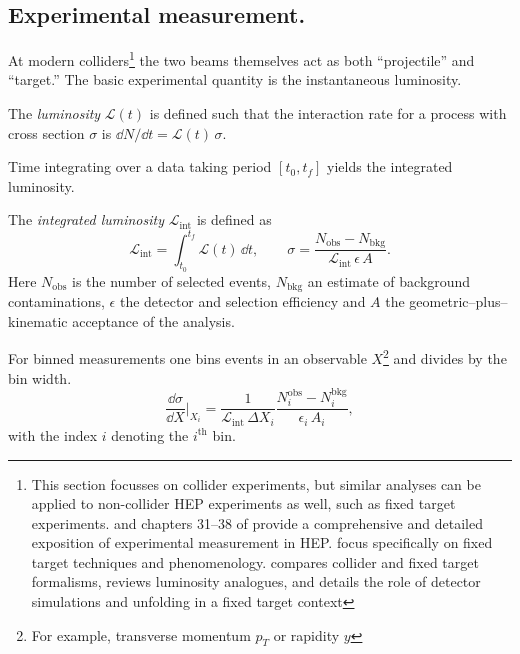 \begin{definition}
    \subsection{Experimental measurement.}
    \label{subsec:exp_measurement}
        At modern colliders\footnote{
            This section focusses on collider experiments, but similar analyses can be applied to non-collider HEP experiments as well, such as fixed target experiments.
            \cite{leo_techniques_1994} and chapters \numrange{31}{38} of \cite{particle_data_group_review_2022} provide a comprehensive and detailed exposition of experimental measurement in HEP.
            \cite{Brodsky2013PhysicsBeams, AveryCrossRates} focus specifically on fixed target techniques and phenomenology.
            \cite{MuheimNuclearLaws} compares collider and fixed target formalisms, reviews luminosity analogues, and details the role of detector simulations and unfolding in a fixed target context
        } the two beams themselves act as both ``projectile'' and ``target.'' 
        The basic experimental quantity is the instantaneous luminosity.
        \begin{definition}
            The \emph{luminosity} \(\mathcal{L}(t)\) is defined such that the interaction rate for a process with cross section \(\sigma\) is \(\dd N/\dd t = \mathcal{L}(t)\,\sigma\).
        \end{definition}

        Time integrating over a data taking period \([t_0, t_f]\) yields the integrated luminosity.
        \begin{definition}
            The \emph{integrated luminosity} \(\mathcal{L}_{\text{int}}\) is defined as
            \begin{equation}
                \mathcal{L}_{\text{int}}
                = \int_{t_0}^{t_f} \mathcal{L}(t)\,\dd t,
                \qquad
                \sigma
                = \frac{N_{\text{obs}} - N_{\text{bkg}}}
                       {\mathcal{L}_{\text{int}}\,\epsilon\,A}.
                \label{eq:crossec_collider}
              \end{equation}
              Here \(N_{\text{obs}}\) is the number of selected events, \(N_{\text{bkg}}\) an estimate of background contaminations, \(\epsilon\) the detector and selection efficiency and \(A\) the geometric--plus--kinematic acceptance of the analysis.
        \end{definition}


        For binned measurements one bins events in an observable \(X\)\footnote{For example, transverse momentum \(p_T\) or rapidity \(y\)} and divides by the bin width.
        \begin{equation}
          \frac{\dd\sigma}{\dd X}\Big|_{X_i}
          = \frac{1}{\mathcal{L}_{\text{int}}\,\Delta X_i}
            \frac{N_i^{\text{obs}} - N_i^{\text{bkg}}}
                 {\epsilon_i\,A_i},
          \label{eq:diff_crossec_collider}
        \end{equation}
        with the index \(i\) denoting the \(i^{\text{th}}\) bin.


\end{definition}
